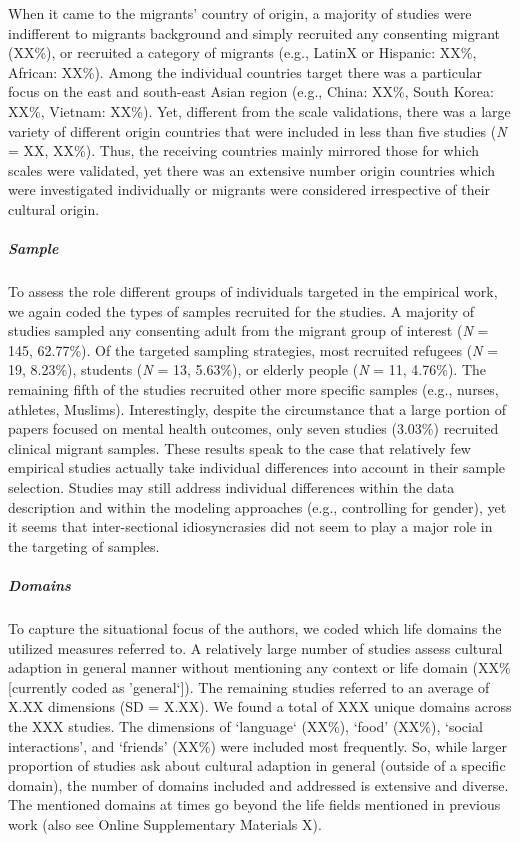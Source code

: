 \documentclass[man, 12pt, a4paper]{apa7}
\begin{document}
When it came to the migrants' country of origin, a majority of studies were indifferent to migrants background and simply recruited any consenting migrant (XX\%), or recruited a category of migrants (e.g., LatinX or Hispanic: XX\%, African: XX\%). Among the individual countries target there was a particular focus on the east and south-east Asian region (e.g., China: XX\%, South Korea: XX\%, Vietnam: XX\%). Yet, different from the scale validations, there was a large variety of different origin countries that were included in less than five studies (\textit{N} = XX, XX\%). Thus, the receiving countries mainly mirrored those for which scales were validated, yet there was an extensive number origin countries which were investigated individually or migrants were considered irrespective of their cultural origin.

\subparagraph{Sample}
To assess the role different groups of individuals targeted in the empirical work, we again coded the types of samples recruited for the studies. A majority of studies sampled any consenting adult from the migrant group of interest (\textit{N} = 145, 62.77\%). Of the targeted sampling strategies, most recruited refugees (\textit{N} = 19, 8.23\%), students (\textit{N} = 13, 5.63\%), or elderly people (\textit{N} = 11, 4.76\%). The remaining fifth of the studies recruited other more specific samples (e.g., nurses, athletes, Muslims). Interestingly, despite the circumstance that a large portion of papers focused on mental health outcomes, only seven studies (3.03\%) recruited clinical migrant samples. These results speak to the case that relatively few empirical studies actually take individual differences into account in their sample selection. Studies may still address individual differences within the data description and within the modeling approaches (e.g., controlling for gender), yet it seems that inter-sectional idiosyncrasies did not seem to play a major role in the targeting of samples.

\subparagraph{Domains}
To capture the situational focus of the authors, we coded which life domains the utilized measures referred to. A relatively large number of studies assess cultural adaption in general manner without mentioning any context or life domain (XX\% [currently coded as 'general‘]). The remaining studies referred to an average of X.XX dimensions (SD = X.XX). We found a total of XXX unique domains across the XXX studies. The dimensions of `language‘ (XX\%), `food’ (XX\%), `social interactions’, and `friends’ (XX\%) were included most frequently. So, while larger proportion of studies ask about cultural adaption in general (outside of a specific domain), the number of domains included and addressed is extensive and diverse. The mentioned domains at times go beyond the life fields mentioned in previous work (also see Online Supplementary Materials X).
\vspace{1em}
\end{document}
